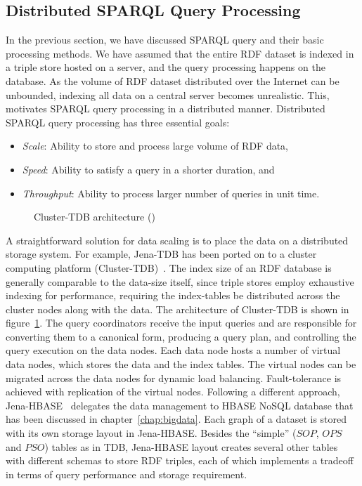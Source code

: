 \subsection{Distributed SPARQL Query Processing}
\label{sec:knowledge:distributed-sparql}

In the previous section, we have discussed SPARQL query and their basic processing methods. We have assumed that the entire RDF
dataset is indexed in a triple store hosted on a server, and the query processing happens on the database. As the volume of RDF
dataset distributed over the Internet can be unbounded, indexing all data on a central server becomes unrealistic. This, motivates 
SPARQL query processing in a distributed manner. 
%
Distributed SPARQL query  processing has three essential goals:
\begin{itemize}
	\item {\em Scale}: Ability to store and process large volume of RDF data,
	\item {\em Speed}: Ability to satisfy a query in a shorter duration, and
	\item {\em Throughput}: Ability to process larger number of queries in unit time.
\end{itemize}

\begin{figure}[!htbp]
	\centerline{
	}
	\caption{Cluster-TDB architecture ()}
	\label{fig:knowledge:cluster-tdb}
\end{figure}

\noindent
{}  
A straightforward solution for data scaling is to place the data on a distributed storage system. For example, Jena-TDB has
been ported on to a cluster computing platform (Cluster-TDB)~\citep{Owens:2009}. The index size of an RDF database is generally comparable
to the data-size itself, since triple stores employ exhaustive indexing for performance, requiring the index-tables be
distributed across the cluster nodes along with the data. The architecture of Cluster-TDB is shown in figure~\ref{fig:knowledge:cluster-tdb}.
The query coordinators receive the input queries and are responsible for converting them to a canonical form, producing a 
query plan, and controlling the query execution on the data nodes. Each data node hosts a number of virtual data nodes,
which stores the data and the index tables. The virtual nodes can be migrated across the data nodes for dynamic load balancing. 
Fault-tolerance is achieved with replication of the virtual nodes.
%
   
Following a different approach, Jena-HBASE~\citep{Khadilkar:2012} delegates the data management to HBASE NoSQL database that has 
been discussed in chapter~\ref{chap:bigdata}. Each graph of a dataset is stored with its own storage layout in Jena-HBASE. Besides 
the ``simple'' ($SOP$, $OPS$ and $PSO$) tables as in TDB, Jena-HBASE layout creates several other tables with different schemas
to store RDF triples, each of which implements a tradeoff in terms of query performance and storage requirement. 

